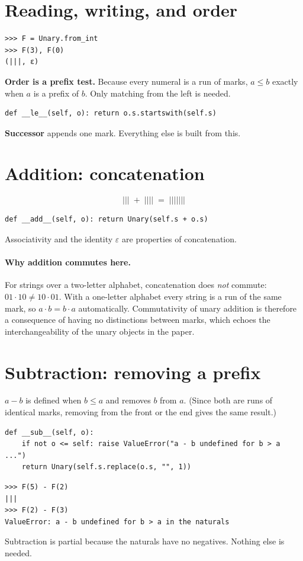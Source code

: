 \documentclass[11pt]{article}
\newcommand{\m}{\texttt{|}}
\begin{document}
\section{Reading, writing, and order}
\begin{lstlisting}
>>> F = Unary.from_int
>>> F(3), F(0)
(|||, ε)
\end{lstlisting}
\textbf{Order is a prefix test.} Because every numeral is a run of marks,
$a\le b$ exactly when $a$ is a prefix of $b$. Only matching from the left is needed.
\begin{lstlisting}
def __le__(self, o): return o.s.startswith(self.s)
\end{lstlisting}
\textbf{Successor} appends one mark. Everything else is built from this.

\section{Addition: concatenation}
\[
  \m\m\m \;+\; \m\m\m\m \;=\; \m\m\m\m\m\m\m
\]
\begin{lstlisting}
def __add__(self, o): return Unary(self.s + o.s)
\end{lstlisting}
Associativity and the identity $\varepsilon$ are properties of concatenation.

\paragraph{Why addition commutes here.} For strings over a two-letter alphabet,
concatenation does \emph{not} commute: $01\cdot 10 \neq 10\cdot 01$. With a one-letter
alphabet every string is a run of the same mark, so $a\cdot b = b\cdot a$
automatically. Commutativity of unary addition is therefore a consequence of having
no distinctions between marks, which echoes the interchangeability of the unary
objects in the paper.

\section{Subtraction: removing a prefix}
$a-b$ is defined when $b\le a$ and removes $b$ from $a$. (Since both are runs of
identical marks, removing from the front or the end gives the same result.)
\begin{lstlisting}
def __sub__(self, o):
    if not o <= self: raise ValueError("a - b undefined for b > a ...")
    return Unary(self.s.replace(o.s, "", 1))
\end{lstlisting}
\begin{lstlisting}
>>> F(5) - F(2)
|||
>>> F(2) - F(3)
ValueError: a - b undefined for b > a in the naturals
\end{lstlisting}
Subtraction is partial because the naturals have no negatives. Nothing else is
needed.
\end{document}
